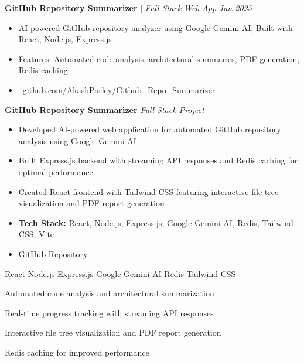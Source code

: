 \textbf{GitHub Repository Summarizer} | \textit{Full-Stack Web App} \hfill \textit{Jan 2025}
\begin{itemize}[leftmargin=*, nosep, topsep=0pt]
    \item AI-powered GitHub repository analyzer using Google Gemini AI; Built with React, Node.js, Express.js
    \item Features: Automated code analysis, architectural summaries, PDF generation, Redis caching
    \item \href{https://github.com/AkashParley/Github_Repo_Summarizer}{\faGithub\ github.com/AkashParley/Github_Repo_Summarizer}
\end{itemize}

\item \textbf{GitHub Repository Summarizer} \hfill \textit{Full-Stack Project}
    \begin{itemize}
        \item Developed AI-powered web application for automated GitHub repository analysis using Google Gemini AI
        \item Built Express.js backend with streaming API responses and Redis caching for optimal performance
        \item Created React frontend with Tailwind CSS featuring interactive file tree visualization and PDF report generation
        \item \textbf{Tech Stack:} React, Node.js, Express.js, Google Gemini AI, Redis, Tailwind CSS, Vite
        \item \href{https://github.com/AkashParley/Github_Repo_Summarizer}{GitHub Repository}
    \end{itemize}

\begin{resumeProject}
    \begin{resumeProjectTech}
        React \textbullet{} Node.js \textbullet{} Express.js \textbullet{} Google Gemini AI \textbullet{} Redis \textbullet{} Tailwind CSS
    \end{resumeProjectTech}
    \begin{resumeProjectFeatures}
        \item Automated code analysis and architectural summarization
        \item Real-time progress tracking with streaming API responses
        \item Interactive file tree visualization and PDF report generation
        \item Redis caching for improved performance
    \end{resumeProjectFeatures}
\end{resumeProject}

